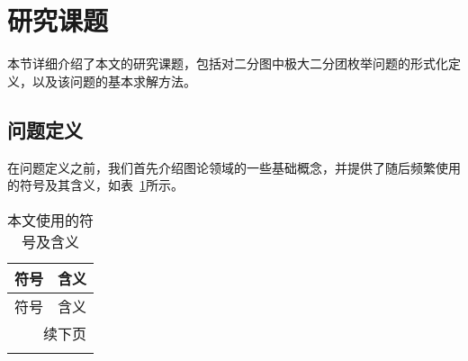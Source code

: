 \section{研究课题}
\label{sec:topic}

本节详细介绍了本文的研究课题，包括对二分图中极大二分团枚举问题的形式化定义，以及该问题的基本求解方法。

\subsection{问题定义}


在问题定义之前，我们首先介绍图论领域的一些基础概念，并提供了随后频繁使用的符号及其含义，如表~\ref{tab:definition}所示。

\begin{longtable}[htbp]{|c|p{12cm}|}
    \caption{本文使用的符号及含义}
    \label{tab:definition} \\
    
    \hline
    符号 & 含义 \\ \hline
    \endfirsthead
    
    \hline
    符号 & 含义 \\ \hline
    \endhead
    
    \hline
    \multicolumn{2}{r}{续下页} \\
    \endfoot
    
    \hline
    \endlastfoot
    

\end{longtable}
